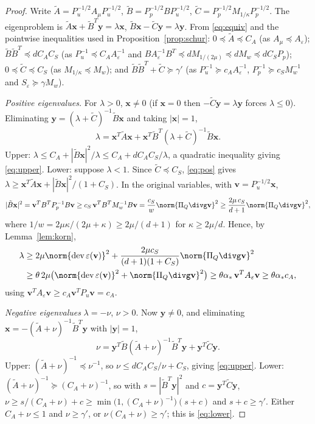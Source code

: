 \documentclass[11pt]{article}
\numberwithin{equation}{section}
\theoremstyle{remark}
\newcommand{\eps}{\varepsilon}
\newcommand{\dev}{\operatorname{dev}}
\newcommand{\vv}{\mathbf{v}}
\newcommand{\vx}{\mathbf{x}}
\newcommand{\vy}{\mathbf{y}}
\newcommand{\Ae}{A_{\eps}}
\newcommand{\Amu}{A_{\mu}}
\newcommand{\Mk}{M_{1/\kappa}}
\newcommand{\Mw}{M_{w}}
\newcommand{\Pq}{\Pi_{Q}}
\begin{document}
\begin{proof}
Write $\tilde A = P_u^{-1/2}\Amu P_u^{-1/2}$, $\tilde B =
P_p^{-1/2}BP_u^{-1/2}$, $\tilde C = P_p^{-1/2}\Mk P_p^{-1/2}$. The eigenproblem
is $\tilde A\vx + \tilde B^T\vy = \lambda\vx$, $\tilde B\vx - \tilde C\vy =
\lambda\vy$. From \eqref{eq:equiv} and the pointwise inequalities used in
Proposition~\ref{prop:schur}: $0\preceq\tilde A\preceq C_A$ (as
$\Amu\preceq\Ae$); $\tilde B\tilde B^T\preceq dC_AC_S$ (as
$P_u^{-1}\preceq C_A\Ae^{-1}$ and $B\Ae^{-1}B^T\preceq dM_{1/(2\mu)}\preceq
d\Mw\preceq dC_SP_p$); $0\preceq\tilde C\preceq C_S$ (as $\Mk\preceq\Mw$);
and $\tilde B\tilde B^T + \tilde C\succeq\gamma'$ (as $P_u^{-1}\succeq
c_A\Ae^{-1}$, $P_p^{-1}\succeq c_S\Mw^{-1}$ and $S_\eps\succeq\gamma\Mw$).

\emph{Positive eigenvalues.} For $\lambda>0$, $\vx\ne0$ (if $\vx = 0$ then
$-\tilde C\vy = \lambda\vy$ forces $\lambda\le0$). Eliminating $\vy =
(\lambda + \tilde C)^{-1}\tilde B\vx$ and taking $|\vx| = 1$,
\begin{equation}
  \lambda = \vx^T\tilde A\vx + \vx^T\tilde B^T(\lambda + \tilde C)^{-1}
  \tilde B\vx .
  \label{eq:pos}
\end{equation}
Upper: $\lambda\le C_A + |\tilde B\vx|^2/\lambda\le C_A + dC_AC_S/\lambda$,
a quadratic inequality giving \eqref{eq:upper}. Lower: suppose $\lambda<1$.
Since $\tilde C\preceq C_S$, \eqref{eq:pos} gives $\lambda\ge\vx^T\tilde
A\vx + |\tilde B\vx|^2/(1 + C_S)$. In the original variables, with $\vv =
P_u^{-1/2}\vx$,
\[
  |\tilde B\vx|^2 = \vv^TB^TP_p^{-1}B\vv\ge c_S\,\vv^TB^T\Mw^{-1}B\vv
  = \frac{c_S}{w}\norm{\Pq\divg\vv}^2
  \ge\frac{2\mu\,c_S}{d+1}\norm{\Pq\divg\vv}^2 ,
\]
where $1/w = 2\mu\kappa/(2\mu + \kappa)\ge2\mu/(d+1)$ for
$\kappa\ge2\mu/d$. Hence, by Lemma~\ref{lem:korn},
\begin{align*}
  \lambda&\ge2\mu\norm{\dev\eps(\vv)}^2 + \frac{2\mu c_S}{(d+1)(1+C_S)}
  \norm{\Pq\divg\vv}^2\\
  &\ge\theta\,2\mu\bigl(\norm{\dev\eps(\vv)}^2 +
  \norm{\Pq\divg\vv}^2\bigr)\ge\theta\alpha_*\,\vv^T\Ae\vv
  \ge\theta\alpha_*c_A ,
\end{align*}
using $\vv^T\Ae\vv\ge c_A\vv^TP_u\vv = c_A$.

\emph{Negative eigenvalues} $\lambda = -\nu$, $\nu>0$. Now $\vy\ne0$, and
eliminating $\vx = -(\tilde A + \nu)^{-1}\tilde B^T\vy$ with $|\vy| = 1$,
\begin{equation}
  \nu = \vy^T\tilde B(\tilde A + \nu)^{-1}\tilde B^T\vy + \vy^T\tilde C\vy .
  \label{eq:neg}
\end{equation}
Upper: $(\tilde A + \nu)^{-1}\preceq\nu^{-1}$, so $\nu\le dC_AC_S/\nu + C_S$,
giving \eqref{eq:upper}. Lower: $(\tilde A + \nu)^{-1}\succeq(C_A +
\nu)^{-1}$, so with $s = |\tilde B^T\vy|^2$ and $c = \vy^T\tilde C\vy$,
$\nu\ge s/(C_A + \nu) + c\ge\min\bigl(1,(C_A + \nu)^{-1}\bigr)(s + c)$ and
$s + c\ge\gamma'$. Either $C_A + \nu\le1$ and $\nu\ge\gamma'$, or
$\nu(C_A + \nu)\ge\gamma'$; this is \eqref{eq:lower}.
\end{proof}
\end{document}
